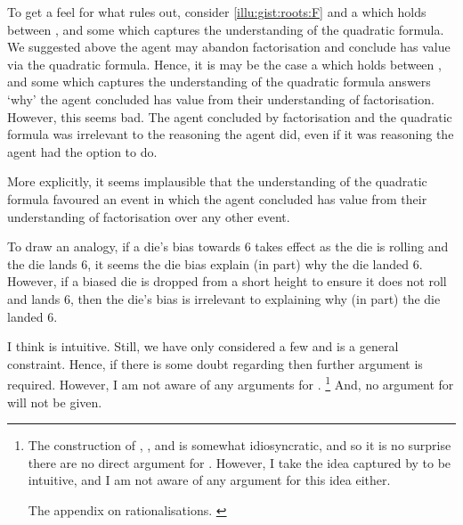 \begin{note}
  To get a feel for what \issueInclusion{} rules out, consider \autoref{illu:gist:roots:F} and a \ros{} which holds between \propM{\rootsCon{}},  and some \pool{} which captures the \agents{} understanding of the quadratic formula.
  We suggested above the agent may abandon factorisation and conclude \propM{\rootsCon{}} has value  via the quadratic formula.
  Hence, it is may be the case a \ros{} which holds between \propM{\rootsCon{}},  and some \pool{} which captures the \agents{} understanding of the quadratic formula answers `why' the agent concluded \propM{\rootsCon{}} has value  from their understanding of factorisation.
  However, this seems bad.
  The agent concluded by factorisation and the quadratic formula was irrelevant to the reasoning the agent did, even if it was reasoning the agent had the option to do.

  More explicitly, it seems implausible that the \agents{} understanding of the quadratic formula favoured an event in which the agent concluded \propM{\rootsCon{}} has value  from their understanding of factorisation over any other event.

  To draw an analogy, if a die's bias towards \(6\) takes effect as the die is rolling and the die lands \(6\), it seems the die bias explain (in part) why the die landed \(6\).
  However, if a biased die is dropped from a short height to ensure it does not roll and lands \(6\), then the die's bias is irrelevant to explaining why (in part) the die landed \(6\).
\end{note}


\begin{note}
  I think \issueInclusion{} is intuitive.
  Still, we have only considered a few  and \issueInclusion{} is a general constraint.
  Hence, if there is some doubt regarding \issueInclusion{} then further argument is required.
  However, I am not aware of any arguments for \issueInclusion{}.%
  \footnote{
    The construction of \qWhy{}, \qHow{}, and \issueInclusion{} is somewhat idiosyncratic, and so it is no surprise there are no direct argument for \issueInclusion{}.
    However, I take the idea captured by \issueInclusion{} to be intuitive, and I am not aware of any argument for this idea either.

    {
      \color{blue}
      The appendix on rationalisations.
    }
  }
  And, no argument for \issueInclusion{} will not be given.
\end{note}



